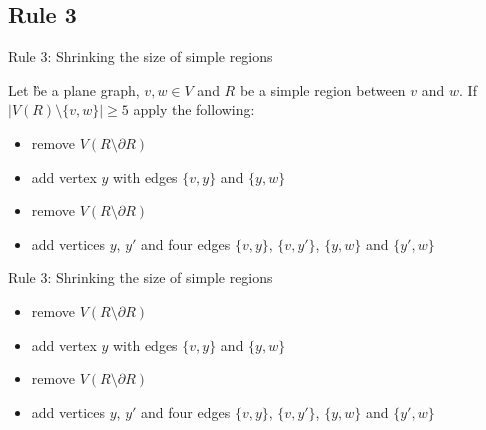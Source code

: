 \subsection{Rule 3}
\begin{frame}[c]{Rule 3: Shrinking the size of simple regions}

    Let \G be a plane graph, $v, w \in V$ and $R$ be a simple region between $v$ and $w$. If $|V(R) \setminus \{v, w\}| \geq 5$ apply the following:

    \begin{caseof}

            \begin{itemize}
                    \item remove $V(R\setminus\partial R)$
                    \item add vertex $y$ with edges $\{v, y\}$ and $\{y, w\}$
            \end{itemize}


            \begin{itemize}
                    \item remove $V(R\setminus\partial R)$
                    \item add vertices $y$, $y'$ and four edges $\{v,y\}$, $\{v, y'\}$, $\{y, w\}$ and $\{y', w\}$
            \end{itemize}
        \end{caseof}
\end{frame}

\begin{frame}[c]{Rule 3: Shrinking the size of simple regions}

    \begin{caseof}
        {\bfseries

            \begin{itemize}
                    \item remove $V(R\setminus\partial R)$
                    \item add vertex $y$ with edges $\{v, y\}$ and $\{y, w\}$
            \end{itemize}
        }


            \begin{itemize}
                    \item remove $V(R\setminus\partial R)$
                    \item add vertices $y$, $y'$ and four edges $\{v,y\}$, $\{v, y'\}$, $\{y, w\}$ and $\{y', w\}$
            \end{itemize}
        \end{caseof}

    \begin{figure}[!ht]
    \end{figure}
\end{frame}

